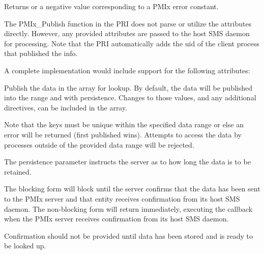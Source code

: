 \begin{arglist}
\end{arglist}

Returns  or a negative value corresponding to a PMIx error constant.

\priattr
The PMIx\_Publish function in the \ac{PRI} does not parse or utilize the attributes directly. However, any provided attributes are passed to the host \ac{SMS} daemon for processing. Note that the \ac{PRI} automatically adds the uid of the client process that published the info.

\optattr
A complete implementation would include support for the following attributes:



\descr

Publish the data in the  array for lookup.
By default, the data will be published into the  range and with  persistence.
Changes to those values, and any additional directives, can be included in the  array.

Note that the keys must be unique within the specified data range or else an error will be returned (first published wins).
Attempts to access the data by processes outside of the provided data range will be rejected.

The persistence parameter instructs the server as to how long the data is to be retained.

The blocking form will block until the server confirms that the data has been sent to the \ac{PMIx} server and that entity receives confirmation from its host \ac{SMS} daemon.
The non-blocking form will return immediately, executing the callback when the \ac{PMIx} server receives confirmation from its host \ac{SMS} daemon.

\adviceimplstart
Confirmation should not be provided until data has been stored and is ready to be looked up.
\adviceimplend

\subsection{}

